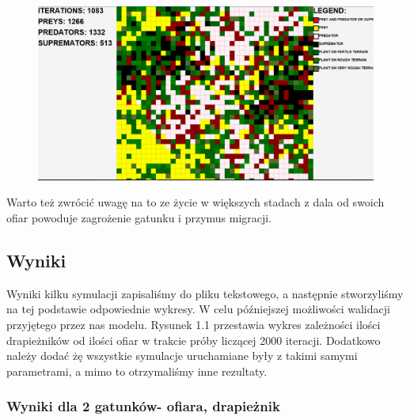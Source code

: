 \begin{figure}[H]
	\centering
	\includegraphics[width=1.0\linewidth]{img/dare3}
	\caption{\label{fig:pps3} }
\end{figure}

 Warto też zwrócić uwagę na to ze życie w większych stadach z dala od swoich ofiar powoduje zagrożenie gatunku i przymus migracji.
 

\subsection{Wyniki}

Wyniki kilku symulacji zapisaliśmy do pliku tekstowego, a następnie stworzyliśmy na tej podstawie odpowiednie wykresy. W celu późniejszej możliwości walidacji przyjętego przez nas modelu.
Rysunek 1.1 przestawia wykres zależności ilości drapieżników od ilości ofiar w trakcie próby liczącej 2000 iteracji.
Dodatkowo należy dodać żę wszystkie symulacje uruchamiane były z takimi samymi parametrami, a mimo to otrzymaliśmy inne rezultaty. 




\subsubsection{Wyniki dla 2 gatunków- ofiara, drapieżnik}



